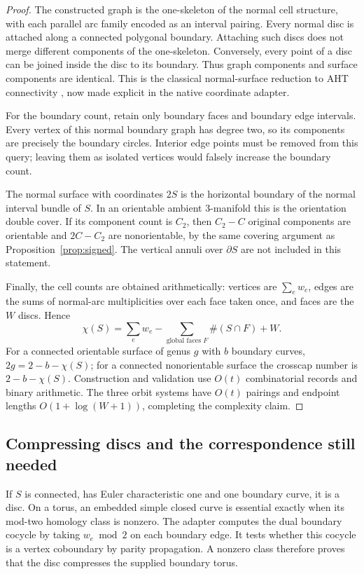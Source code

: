 \documentclass[11pt]{article}
\theoremstyle{definition}
\begin{document}
\begin{proof}
The constructed graph is the one-skeleton of the normal cell structure,
with each parallel arc family encoded as an interval pairing. Every
normal disc is attached along a connected polygonal boundary. Attaching
such discs does not merge different components of the one-skeleton.
Conversely, every point of a disc can be joined inside the disc to its
boundary. Thus graph components and surface components are identical.
This is the classical normal-surface reduction to AHT connectivity
\cite{aht}, now made explicit in the native coordinate adapter.

For the boundary count, retain only boundary faces and boundary edge
intervals. Every vertex of this normal boundary graph has degree two,
so its components are precisely the boundary circles. Interior edge
points must be removed from this query; leaving them as isolated
vertices would falsely increase the boundary count.

The normal surface with coordinates $2S$ is the horizontal boundary
of the normal interval bundle of $S$. In an orientable ambient
3-manifold this is the orientation double cover. If its component
count is $C_2$, then $C_2-C$ original components are orientable and
$2C-C_2$ are nonorientable, by the same covering argument as
Proposition~\ref{prop:signed}. The vertical annuli over $\partial S$
are not included in this statement.

Finally, the cell counts are obtained arithmetically: vertices are
$\sum_e w_e$, edges are the sums of normal-arc multiplicities over
each face taken once, and faces are the $W$ discs. Hence
\[
             \chi(S)=\sum_e w_e-
                 \sum_{\text{global faces }F}\#(S\cap F)+W.
\]
For a connected orientable surface of genus $g$ with $b$ boundary
curves, $2g=2-b-\chi(S)$; for a connected nonorientable surface the
crosscap number is $2-b-\chi(S)$. Construction and validation use
$O(t)$ combinatorial records and binary arithmetic. The three orbit
systems have $O(t)$ pairings and endpoint lengths
$O(1+\log(W+1))$, completing the complexity claim.
\end{proof}

\subsection{Compressing discs and the correspondence still needed}

If $S$ is connected, has Euler characteristic one and one boundary
curve, it is a disc. On a torus, an embedded simple closed curve is
essential exactly when its mod-two homology class is nonzero. The
adapter computes the dual boundary cocycle by taking $w_e\bmod2$ on
each boundary edge. It tests whether this cocycle is a vertex
coboundary by parity propagation. A nonzero class therefore proves
that the disc compresses the supplied boundary torus.
\end{document}
